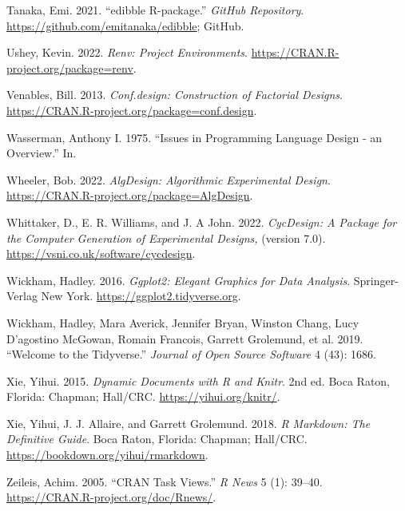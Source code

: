 \documentclass{article}
\newlength{\cslhangindent}
\newlength{\cslentryspacingunit} %
\newenvironment{CSLReferences}[2] %
 {%
  \setlength{\parindent}{0pt}
  \ifodd #1
  \let\oldpar\par
  \def\par{\hangindent=\cslhangindent\oldpar}
  \fi
  \setlength{\parskip}{#2\cslentryspacingunit}
 }%
 {}
\begin{document}
\begin{CSLReferences}{1}{0}
\leavevmode{}%
Tanaka, Emi. 2021. {``{edibble R-package}.''} \emph{GitHub Repository}.
\url{https://github.com/emitanaka/edibble}; GitHub.

\leavevmode{}%
Ushey, Kevin. 2022. \emph{Renv: Project Environments}.
\url{https://CRAN.R-project.org/package=renv}.

\leavevmode{}%
Venables, Bill. 2013. \emph{Conf.design: Construction of Factorial
Designs}. \url{https://CRAN.R-project.org/package=conf.design}.

\leavevmode{}%
Wasserman, Anthony I. 1975. {``Issues in Programming Language Design -
an Overview.''} In.

\leavevmode{}%
Wheeler, Bob. 2022. \emph{AlgDesign: Algorithmic Experimental Design}.
\url{https://CRAN.R-project.org/package=AlgDesign}.

\leavevmode{}%
Whittaker, D., E. R. Williams, and J. A John. 2022. \emph{CycDesign: A
Package for the Computer Generation of Experimental Designs,} (version
7.0). \url{https://vsni.co.uk/software/cycdesign}.

\leavevmode{}%
Wickham, Hadley. 2016. \emph{Ggplot2: Elegant Graphics for Data
Analysis}. Springer-Verlag New York.
\url{https://ggplot2.tidyverse.org}.

\leavevmode{}%
Wickham, Hadley, Mara Averick, Jennifer Bryan, Winston Chang, Lucy
D'agostino McGowan, Romain Francois, Garrett Grolemund, et al. 2019.
{``Welcome to the Tidyverse.''} \emph{Journal of Open Source Software} 4
(43): 1686.

\leavevmode{}%
Xie, Yihui. 2015. \emph{Dynamic Documents with {R} and Knitr}. 2nd ed.
Boca Raton, Florida: Chapman; Hall/CRC. \url{https://yihui.org/knitr/}.

\leavevmode{}%
Xie, Yihui, J. J. Allaire, and Garrett Grolemund. 2018. \emph{R
Markdown: The Definitive Guide}. Boca Raton, Florida: Chapman; Hall/CRC.
\url{https://bookdown.org/yihui/rmarkdown}.

\leavevmode{}%
Zeileis, Achim. 2005. {``{CRAN} Task Views.''} \emph{R News} 5 (1):
39--40. \url{https://CRAN.R-project.org/doc/Rnews/}.


\end{CSLReferences}
\end{document}
